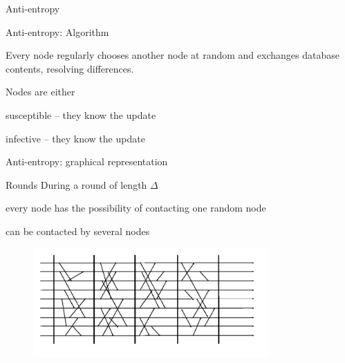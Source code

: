 \begin{frame}{Anti-entropy}
		
\begin{block}{Anti-entropy: Algorithm}
\BIL
\item Every node regularly chooses another node at random and exchanges 
database contents, resolving differences.
\item Nodes are either 
 \BI
 \item \alert{susceptible} -- they know the update
 \item \alert{infective} -- they know the update
 \EI
\EIL
\end{block}

\begin{Procedure}
\caption{Anti-entropy protocol executed by process $p_i$:}
\end{Procedure}

\end{frame}

\begin{frame}{Anti-entropy: graphical representation}
\begin{block}{Rounds}
During a \alert{round} of length $\Delta$
\BI
\item every node has the possibility of contacting one random node
\item can be contacted by several nodes
\EI
\end{block}

\begin{figure}
\includegraphics[width=0.8\textwidth]{figs/05/rounds}
\end{figure}

\end{frame}


